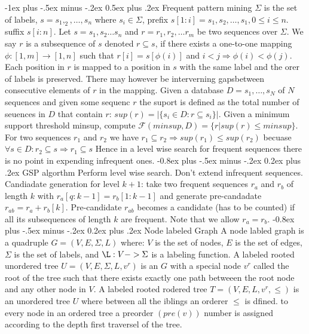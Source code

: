 \documentclass[8pt,landscape]{extarticle}
\makeatletter
\renewcommand{\section}{\@startsection{section}{1}{0mm}%
                                {-1ex plus -.5ex minus -.2ex}%
                                {0.5ex plus .2ex}%
                                {\normalfont\large\bfseries}}
\renewcommand{\subsection}{\@startsection{subsection}{2}{0mm}%
                                {-0.8ex plus -.5ex minus -.2ex}%
                                {0.2ex plus .2ex}%
                                {\normalfont\normalsize\bfseries}}
\makeatother
\begin{document}
\begin{multicols}{3}
\section{Frequent pattern mining}
$\Sigma$ is the set of labels, $s=s_1,_2,\dots,s_n$ where $s_i \in \Sigma$,
prefix $s[1:i]=s_1,s_2,\dots,s_1, 0 \leq i \leq n$. suffix $s[i:n]$.
Let $s=s_1,s_2\dots s_n$ and $r=r_1,r_2,\dots r_m$ be two sequences over
$\Sigma$. We say $r$ is a subsequence of $s$ denoted $r \subseteq s$, if there
exists a one-to-one mapping $\phi:[1,m]\to[1,n]$ such that $r[i]=s[\phi(i)]$ and
$i< j \Rightarrow \phi(i)<\phi(j)$.
Each position in $r$ is mapped to a position in $s$ with the same label and the
orer of labels is preserved. There may however be interverning gapsbetween
consecutive elements of $r$ in the mapping.
Given a database $D={s_1,\dots,s_N}$ of $N$ sequences and given some sequenc $r$
the suport is defined as the total number of seuences in $D$ that contain $r$:
$sup(r)=|\{s_i\in D:r\subseteq s_i\}|$. Given a minimum support threshold minsup,
compute $\mathcal{F}(minsup,D)=\{r|sup(r)\leq minsup\}$.
For two sequences $r_1$ and $r_2$ we have $r_1 \subseteq r_2 \Rightarrow
sup(r_1) \leq sup(r_2)$ becuase $\forall s \in D: r_2 \subseteq s \Rightarrow
r_1 \subseteq s$
Hence in a level wise search for frequent sequences there is no point in
expending infrequent ones.
\subsection{GSP algorthm}
Perform level wise search. Don't extend infrequent sequences.
Candiadate generation for level $k+1$: take two frequent sequences $r_a$ and
$r_b$ of length $k$ with $r_a[q:k-1]=r_b[1:k-1]$ and generate pre-candadate
$r_{ab}=r_a+r_b[k]$. Pre-candidate $r_{ab}$ becomes a candidate (has to be
counted) if all its subsequences of length $k$ are frequent. Note that we allow
$r_a = r_b$.
\subsection{Node labeled Graph}
A node labled graph is a quadruple $G=(V,E,\Sigma,L)$ where: $V$ is the set of
nodes, $E$ is the set of edges, $\Sigma$ is the set of labels, and $\L: V->
\Sigma$ is a labeling function.
A labeled rooted unordered tree $U = (V , E , \Sigma, L, v^r )$ is an $G$ with a
special node $v^r$ called the root of the tree such that there exists exactly
one path betweeen the root node and any other node in $V$.
A labeled rooted rodered tree $T = (V, E, L, v^r, \leq)$ is an unordered tree
$U$ where between all the iblings an orderer $\leq$ is dfined. to every node in
an ordered tree a preorder $(pre(v))$ number is assigned according to the depth
first traversel of the tree.

\end{multicols}
\end{document}
